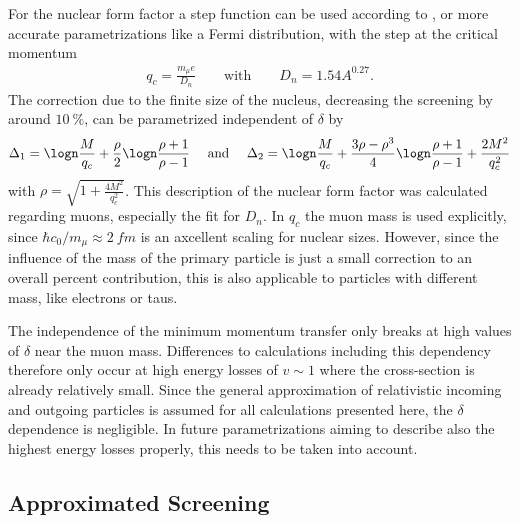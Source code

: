 For the nuclear form factor a step function can be used according to \cite{Bugaev77}, or more accurate parametrizations like a Fermi distribution, with the step at the critical momentum \cite{Kelner95Brems}
\begin{align}
    q_c = \frac{m_{\mu}e}{D_n}
    \qquad \text{with} \qquad
    D_n = 1.54 A^{0.27} .
\end{align}
The correction due to the finite size of the nucleus, decreasing the screening by around $\SI{10}{\percent}$, can be parametrized independent of $\delta$ by \cite{Andreev94Brems}
\begin{align}
    \Delta_1 = \logn \frac{M}{q_c} + \frac{\rho}{2} \logn \frac{\rho + 1}{\rho - 1}
    \quad
    \text{ and }
    \quad
    \Delta_2 = \logn \frac{M}{q_c} + \frac{3\rho - \rho^3}{4} \logn \frac{\rho + 1}{\rho - 1} + \frac{2 M^2}{q_c^2}
\end{align}
with $\rho = \sqrt{1 + \frac{4M^2}{q_c^2}}$.
This description of the nuclear form factor was calculated regarding muons, especially the fit for $D_n$.
In $q_c$ the muon mass is used explicitly, since $\hbar c_0 / m_\mu \approx \SI{2}{fm}$ is an axcellent scaling for nuclear sizes.
However, since the influence of the mass of the primary particle is just a small correction to an overall percent contribution, this is also applicable to particles with different mass, like electrons or taus.

The independence of the minimum momentum transfer only breaks at high values of $\delta$ near the muon mass.
Differences to calculations including this dependency \cite{Kelner95Brems} therefore only occur at high energy losses of $v \sim 1$ where the cross-section is already relatively small.
Since the general approximation of relativistic incoming and outgoing particles is assumed for all calculations presented here, the $\delta$ dependence is negligible.
In future parametrizations aiming to describe also the highest energy losses properly, this needs to be taken into account.

\subsection{Approximated Screening} \label{sec:brems_screen_approx}

